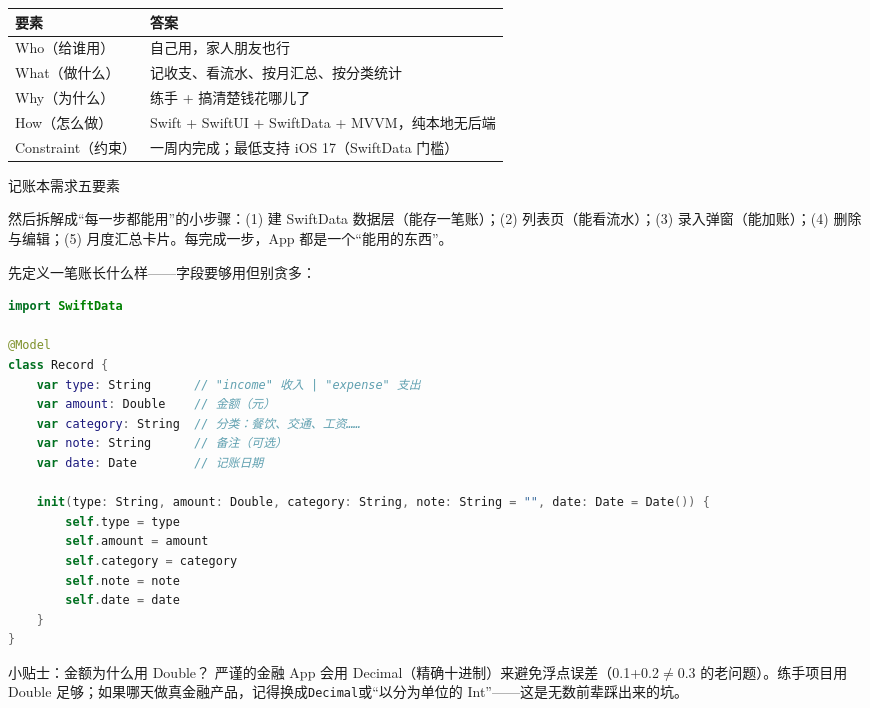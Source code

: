 


\begin{center}
\begin{tabularx}{\linewidth}{|X|X|}
\hline
\textbf{要素} & \textbf{答案} \tabularnewline
\hline
Who（给谁用） & 自己用，家人朋友也行 \tabularnewline
What（做什么） & 记收支、看流水、按月汇总、按分类统计 \tabularnewline
Why（为什么） & 练手 + 搞清楚钱花哪儿了 \tabularnewline
How（怎么做） & Swift + SwiftUI + SwiftData + MVVM，纯本地无后端 \tabularnewline
Constraint（约束） & 一周内完成；最低支持 iOS 17（SwiftData 门槛） \tabularnewline
\hline
\end{tabularx}
\end{center}

\begin{center}\small\color{gray}记账本需求五要素\end{center}

然后拆解成“每一步都能用”的小步骤：(1) 建 SwiftData 数据层（能存一笔账）；(2) 列表页（能看流水）；(3) 录入弹窗（能加账）；(4) 删除与编辑；(5) 月度汇总卡片。每完成一步，App 都是一个“能用的东西”。


先定义一笔账长什么样——字段要够用但别贪多：

\begin{lstlisting}[language=Swift]
import SwiftData

@Model
class Record {
    var type: String      // "income" 收入 | "expense" 支出
    var amount: Double    // 金额（元）
    var category: String  // 分类：餐饮、交通、工资……
    var note: String      // 备注（可选）
    var date: Date        // 记账日期

    init(type: String, amount: Double, category: String, note: String = "", date: Date = Date()) {
        self.type = type
        self.amount = amount
        self.category = category
        self.note = note
        self.date = date
    }
}
\end{lstlisting}

\begin{tcbinfo}{小贴士：金额为什么用 Double？}
严谨的金融 App 会用 Decimal（精确十进制）来避免浮点误差（0.1+0.2$\neq$0.3 的老问题）。练手项目用 Double 足够；如果哪天做真金融产品，记得换成\texttt{Decimal}或“以分为单位的 Int”——这是无数前辈踩出来的坑。

\end{tcbinfo}

